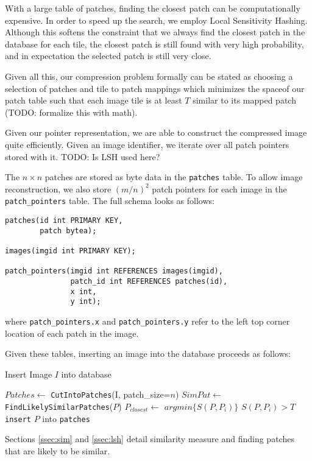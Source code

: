 With a large table of patches, finding the closest patch can be computationally expensive.  In order to speed up the search, we employ Local Sensitivity Hashing.  Although this softens the constraint that we always find the closest patch in the database for each tile, the closest patch is still found with very high probability, and in expectation the selected patch is still very close.

Given all this, our compression problem formally can be stated as choosing a selection of patches and tile to patch mappings which minimizes the spaceof our patch table such that each image tile is at least $T$ similar to its mapped patch (TODO: formalize this with math).

Given our pointer representation, we are able to construct the compressed image quite efficiently.  Given an image identifier, we iterate over all patch pointers stored with it.  TODO: Is LSH used here?


The $n \times n$ patches are stored as byte data in the \texttt{patches} table.
To allow image reconstruction, we also store $(m / n)^2$ patch pointers for
each image in the \texttt{patch\_pointers} table. The full schema looks as follows:
\begin{verbatim}
patches(id int PRIMARY KEY,
        patch bytea);

images(imgid int PRIMARY KEY);

patch_pointers(imgid int REFERENCES images(imgid),
               patch_id int REFERENCES patches(id),
               x int,
               y int);
\end{verbatim}
where \texttt{patch\_pointers.x} and \texttt{patch\_pointers.y}
refer to the left top corner location of each patch in the image.

Given these tables, inserting an image into the database proceeds as follows:

\begin{algorithm}
    \caption{Insert Image $I$ into database}
    \label{alg:insert}
\begin{algorithmic}[1]
\State $Patches \leftarrow $ \texttt{CutIntoPatches}(I, patch\_size=$n$)
\State $SimPat \leftarrow $\texttt{FindLikelySimilarPatches}($P$)
\State $P_{closest} \leftarrow $ $argmin \{ S(P, P_i) \}$
\If $S(P, P_i) > T$
\State \texttt{insert} $P$ into \texttt{patches}
\EndIf
\EndFor
\vspace{3mm}
\end{algorithmic}
\end{algorithm}
Sections \ref{ssec:sim} and \ref{ssec:lsh} detail similarity measure and
finding patches that are likely to be similar.

